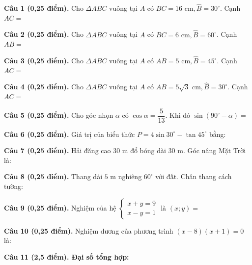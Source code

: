 \documentclass[12pt,a4paper]{article}
\begin{document}
\vspace{1.2mm}
\noindent\textbf{Câu 1 (0,25 điểm).} Cho $\Delta ABC$ vuông tại $A$ có $BC = 16\text{ cm}, \widehat{B} = 30^\circ$. Cạnh $AC =$ \par\vspace{0.6mm}
\noindent\textbf{Câu 2 (0,25 điểm).} Cho $\Delta ABC$ vuông tại $A$ có $BC = 6\text{ cm}, \widehat{B} = 60^\circ$. Cạnh $AB =$ \par\vspace{0.6mm}
\noindent\textbf{Câu 3 (0,25 điểm).} Cho $\Delta ABC$ vuông tại $A$ có $AB = 5\text{ cm}, \widehat{B} = 45^\circ$. Cạnh $AC =$ \par\vspace{0.6mm}
\noindent\textbf{Câu 4 (0,25 điểm).} Cho $\Delta ABC$ vuông tại $A$ có $AB = 5\sqrt{3}\text{ cm}, \widehat{B} = 30^\circ$. Cạnh $AC =$ \par\vspace{0.6mm}
\noindent\textbf{Câu 5 (0,25 điểm).} Cho góc nhọn $\alpha$ có $\cos \alpha = \dfrac{5}{13}$. Khi đó $\sin(90^\circ - \alpha) =$ \par\vspace{0.6mm}
\noindent\textbf{Câu 6 (0,25 điểm).} Giá trị của biểu thức $P = 4\sin 30^\circ - \tan 45^\circ$ bằng: \par\vspace{0.6mm}
\noindent\textbf{Câu 7 (0,25 điểm).} Hải đăng cao $30\text{ m}$ đổ bóng dài $30\text{ m}$. Góc nâng Mặt Trời là: \par\vspace{0.6mm}
\noindent\textbf{Câu 8 (0,25 điểm).} Thang dài $5\text{ m}$ nghiêng $60^\circ$ với đất. Chân thang cách tường: \par\vspace{0.6mm}
\noindent\textbf{Câu 9 (0,25 điểm).} Nghiệm của hệ $\begin{cases} x + y = 9 \\ x - y = 1 \end{cases}$ là $(x; y) =$ \par\vspace{0.6mm}
\noindent\textbf{Câu 10 (0,25 điểm).} Nghiệm dương của phương trình $(x - 8)(x + 1) = 0$ là: \par\vspace{0.6mm}
\vspace{0.8mm}
\noindent\textbf{Câu 11 (2,5 điểm). Đại số tổng hợp:}
\vspace{0.6mm}
\end{document}
